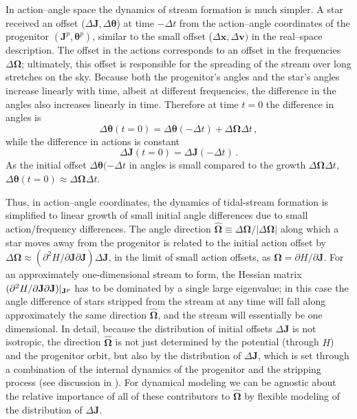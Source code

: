 \documentclass[12pt,preprint]{aastex}
\renewcommand{\vec}[1]{\ensuremath{\mathbf{#1}}}
\newcommand{\unitvec}[1]{\ensuremath{\mathbf{\hat{#1}}}}
\newcommand{\vecx}{\ensuremath{\vec{x}}}
\newcommand{\vecv}{\ensuremath{\vec{v}}}
\newcommand{\vecj}{\ensuremath{\vec{J}}}
\newcommand{\veco}{\ensuremath{\vec{\Omega}}}
\newcommand{\veca}{\ensuremath{\boldsymbol\theta}}
\begin{document}
In action--angle space the dynamics of stream formation is much
simpler. A star received an offset ($\Delta \vecj,\Delta \veca$) at
time $-\Delta t$ from the action--angle coordinates of the progenitor
$(\vecj^p,\veca^p)$, similar to the small offset ($\Delta \vecx,\Delta
\vecv)$ in the real--space description. The offset in the actions
corresponds to an offset in the frequencies $\Delta \veco$;
ultimately, this offset is responsible for the spreading of the stream
over long stretches on the sky. Because both the progenitor's angles and
the star's angles increase linearly with time, albeit at different
frequencies, the difference in the angles also increases linearly in
time. Therefore at time $t=0$ the difference in angles is
\begin{equation}
\Delta \veca(t=0) = \Delta \veca(-\Delta t) + \Delta \veco \Delta t\,,
\end{equation}
while the difference in actions is constant
\begin{equation}
\Delta \vecj(t=0) = \Delta \vecj(-\Delta t)\,.
\end{equation}
As the initial offset $\Delta \veca(-\Delta t$ in angles is small
compared to the growth $\Delta\veco\Delta t$, $\Delta \veca(t=0)
\approx \Delta \veco \Delta t$.

Thus, in action--angle coordinates, the dynamics of tidal-stream
formation is simplified to linear growth of small initial angle
differences due to small action/frequency differences. The angle
direction $\unitvec{\veco} \equiv \Delta \veco / | \Delta \veco|$
along which a star moves away from the progenitor is related to the
initial action offset by $\Delta \veco \approx (\partial^2 H
/ \partial \vecj \partial \vecj) \Delta \vecj$, in the limit of small
action offsets, as $\veco = \partial H / \partial \vecj$. For an
approximately one-dimensional stream to form, the Hessian matrix
$(\partial^2 H / \partial \vecj \partial \vecj)\large|_{\vecj^p}$ has
to be dominated by a single large eigenvalue; in this case the angle
difference of stars stripped from the stream at any time will fall
along approximately the same direction $\unitvec\veco$, and the stream
will essentially be one dimensional. In detail, because the
distribution of initial offsets $\Delta \vecj$ is not isotropic, the
direction $\unitvec \veco$ is not just determined by the potential
(through $H$) and the progenitor orbit, but also by the distribution
of $\Delta \vecj$, which is set through a combination of the internal
dynamics of the progenitor and the stripping process (see discussion
in \citealt{Sanders13b}). For dynamical modeling we can be agnostic
about the relative importance of all of these contributors to
$\unitvec \veco$ by flexible modeling of the distribution of $\Delta
\vecj$.
\end{document}
